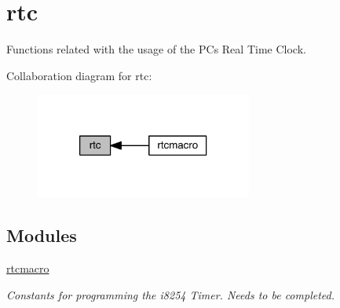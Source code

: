 \hypertarget{group__rtc}{}\section{rtc}
\label{group__rtc}


Functions related with the usage of the PC\textquotesingle{}s Real Time Clock.  


Collaboration diagram for rtc\+:
\nopagebreak
\begin{figure}[H]
\begin{center}
\leavevmode
\includegraphics[width=202pt]{group__rtc}
\end{center}
\end{figure}
\subsection*{Modules}
\begin{DoxyCompactItemize}
\item 
\hyperlink{group__rtcmacro}{rtcmacro}
\begin{DoxyCompactList}\small\item\em Constants for programming the i8254 Timer. Needs to be completed. \end{DoxyCompactList}\end{DoxyCompactItemize}
